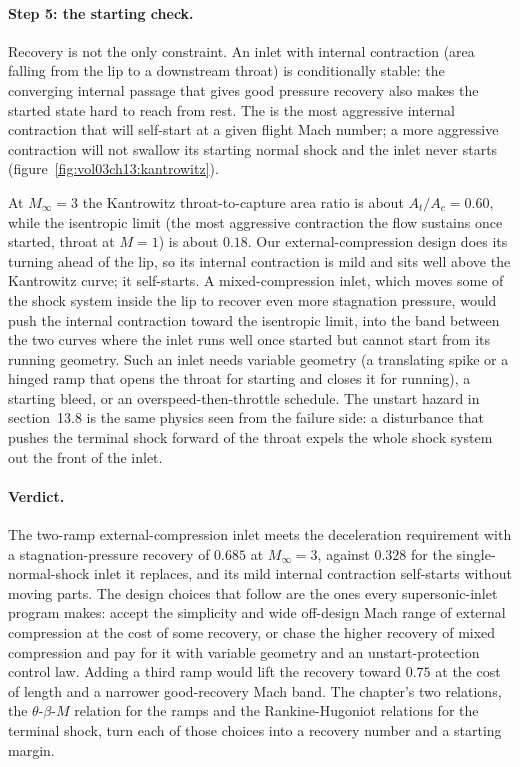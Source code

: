 \paragraph{Step 5: the starting check.} Recovery is not the only
constraint. An inlet with internal contraction (area falling from the
lip to a downstream throat) is conditionally stable: the converging
internal passage that gives good pressure recovery also makes the
started state hard to reach from rest. The
 is the most aggressive internal contraction
that will self-start at a given flight Mach number; a more aggressive
contraction will not swallow its starting normal shock and the inlet
never starts (figure~\ref{fig:vol03ch13:kantrowitz}).

At $M_\infty = 3$
the Kantrowitz throat-to-capture area ratio is about $A_t/A_c = 0.60$,
while the isentropic limit (the most aggressive contraction the flow
sustains once started, throat at $M = 1$) is about $0.18$. Our
external-compression design does its turning ahead of the lip, so its
internal contraction is mild and sits well above the Kantrowitz curve;
it self-starts. A mixed-compression inlet, which moves some of the
shock system inside the lip to recover even more stagnation pressure,
would push the internal contraction toward the isentropic limit, into
the band between the two curves where the inlet runs well once started
but cannot start from its running geometry. Such an inlet needs
variable geometry (a translating spike or a hinged ramp that opens the
throat for starting and closes it for running), a starting bleed, or an
overspeed-then-throttle schedule. The unstart hazard in section~13.8 is
the same physics seen from the failure side: a disturbance that pushes
the terminal shock forward of the throat expels the whole shock system
out the front of the inlet.

\paragraph{Verdict.} The two-ramp external-compression inlet meets the
deceleration requirement with a stagnation-pressure recovery of
$0.685$ at $M_\infty = 3$, against $0.328$ for the single-normal-shock
inlet it replaces, and its mild internal contraction self-starts
without moving parts. The design choices that follow are the ones every
supersonic-inlet program makes: accept the simplicity and wide
off-design Mach range of external compression at the cost of some
recovery, or
chase the higher recovery of mixed compression and pay for it with
variable geometry and an unstart-protection control law. Adding a third
ramp would lift the recovery toward $0.75$ at the cost of length and a
narrower good-recovery Mach band. The chapter's two relations, the
$\theta$-$\beta$-$M$ relation for the ramps and the Rankine-Hugoniot
relations for the terminal shock, turn each of those choices into a
recovery number and a starting margin.

